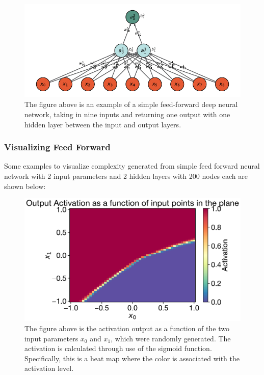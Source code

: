 \begin{figure}[H]
\centering
\includegraphics{../figures/DNN.pdf}
\caption{The figure above is an example of a simple feed-forward deep neural network, taking in nine inputs and returning one output with one hidden layer between the input and output layers.}
\end{figure}
			
\subsubsection{Visualizing Feed Forward}
Some examples to visualize complexity generated from simple feed forward neural network with 2 input parameters and 2 hidden layers with 200 nodes each are shown below:

\begin{figure}[H]
\centering
\includegraphics[scale=0.65]{../figures/activation_heat_map.pdf}
\caption{The figure above is the activation output as a function of the two input parameters $x_0$ and $x_1$, which were randomly generated. The activation is calculated through use of the sigmoid function. Specifically, this is a heat map where the color is associated with the activation level.}
\end{figure}


